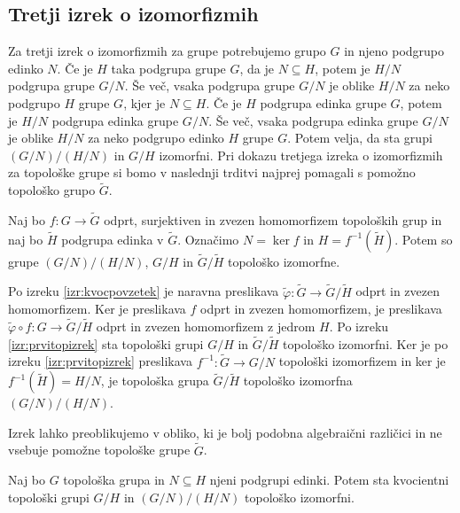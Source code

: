 \documentclass[mat1]{fmfdelo}
\begin{document}
\subsection{Tretji izrek o izomorfizmih}
Za tretji izrek o izomorfizmih za grupe potrebujemo grupo $G$ in njeno podgrupo edinko $N$. Če je $H$ taka podgrupa grupe $G$, da je $N \subseteq H$, potem je $H/N$ podgrupa grupe $G/N$. Še več, vsaka podgrupa grupe $G/N$ je oblike $H/N$ za neko podgrupo $H$ grupe $G$, kjer je $N \subseteq H$. Če je $H$ podgrupa edinka grupe $G$, potem je $H/N$ podgrupa edinka grupe $G/N$. Še več, vsaka podgrupa edinka grupe $G/N$ je oblike $H/N$ za neko podgrupo edinko $H$ grupe $G$. Potem velja, da sta grupi $(G/N)/(H/N)$ in $G/H$ izomorfni. Pri dokazu tretjega izreka o izomorfizmih za topološke grupe si bomo v naslednji trditvi najprej pomagali s pomožno topološko grupo $\widetilde{G}$.
\begin{trditev}\label{trd:predtretji}
	Naj bo $f\colon G \to \widetilde{G}$ odprt, surjektiven in zvezen homomorfizem topoloških grup in naj bo $\widetilde{H}$ podgrupa edinka v $\widetilde{G}$. Označimo $N = \ker f$ in $H = f^{-1}(\widetilde{H})$. Potem so grupe $(G/N)/(H/N)$, $G/H$ in $\widetilde{G}/\widetilde{H}$ topološko izomorfne.
\end{trditev}

\begin{dokaz}
Po izreku \ref{izr:kvocpovzetek} je naravna preslikava $\tilde{\varphi}\colon \widetilde{G} \to \widetilde{G}/\widetilde{H}$ odprt in zvezen homomorfizem. Ker je preslikava $f$ odprt in zvezen homomorfizem, je preslikava $\tilde{\varphi}\circ f\colon G \to \widetilde{G}/\widetilde{H}$ odprt in zvezen homomorfizem z jedrom $H$. Po izreku \ref{izr:prvitopizrek} sta topološki grupi $G/H$ in $\widetilde{G}/\widetilde{H}$ topološko izomorfni. Ker je po izreku \ref{izr:prvitopizrek} preslikava $f^{-1}\colon \widetilde{G} \to G/N$ topološki izomorfizem in ker je $f^{-1}(\widetilde{H}) = H/N$, je topološka grupa $\widetilde{G}/\widetilde{H}$ topološko izomorfna $(G/N)/(H/N)$.
\end{dokaz}
Izrek lahko preoblikujemo v obliko, ki je bolj podobna algebraični različici in ne vsebuje pomožne topološke grupe $\widetilde{G}$.
\begin{izrek}\label{izr:tretjitopizrek}
Naj bo $G$ topološka grupa in $N \subseteq H$ njeni podgrupi edinki. Potem sta kvocientni topološki grupi $G/H$ in $(G/N)/(H/N)$ topološko izomorfni.
\end{izrek}
\end{document}
